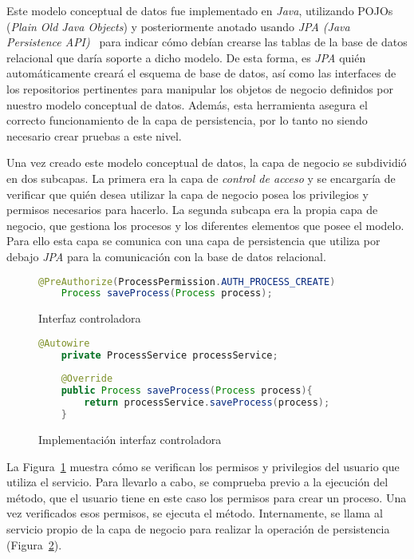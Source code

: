 Este modelo conceptual de datos fue implementado en \emph{Java}, utilizando POJOs (\emph{Plain Old Java Objects}) y posteriormente anotado usando \emph{JPA (Java Persistence API)}~\cite{jpa} para indicar cómo debían crearse las tablas de la base de datos relacional que daría soporte a dicho modelo. De esta forma, es \emph{JPA} quién automáticamente creará el esquema de base de datos, así como las interfaces de los repositorios pertinentes para manipular los objetos de negocio definidos por nuestro modelo conceptual de datos. Además, esta herramienta asegura el correcto funcionamiento de la capa de persistencia, por lo tanto no siendo necesario crear pruebas a este nivel.

Una vez creado este modelo conceptual de datos, la capa de negocio se subdividió en dos subcapas. La primera era la capa de \emph{control de acceso} y se encargaría de verificar que quién desea utilizar la capa de negocio posea los privilegios y permisos necesarios para hacerlo. La segunda subcapa era la propia capa de negocio, que gestiona los procesos y los diferentes elementos que posee el modelo. Para ello esta capa se comunica con una capa de persistencia que utiliza por debajo \emph{JPA} para la comunicación con la base de datos relacional.

\begin{figure}[H]
	\centering
	\begin{lstlisting}[language=Java]
	@PreAuthorize(ProcessPermission.AUTH_PROCESS_CREATE)
	Process saveProcess(Process process);\end{lstlisting}
	\caption{Interfaz controladora}
	\label{fig:interfazControladora}
\end{figure}

\begin{figure}[H]
	\centering
	\begin{lstlisting}[language=Java]
	@Autowire
	private ProcessService processService;
	
	@Override
	public Process saveProcess(Process process){
		return processService.saveProcess(process);
	}\end{lstlisting}
	\caption{Implementación interfaz controladora}
	\label{fig:interfazControladoraImpl}
\end{figure}

La Figura~\ref{fig:interfazControladora} muestra cómo se verifican los permisos y privilegios del usuario que utiliza el servicio. Para llevarlo a cabo, se comprueba previo a la ejecución del método, que el usuario tiene en este caso los permisos para crear un proceso. Una vez verificados esos permisos, se ejecuta el método. Internamente, se llama al servicio propio de la capa de negocio para realizar la operación de persistencia (Figura~\ref{fig:interfazControladoraImpl}).

